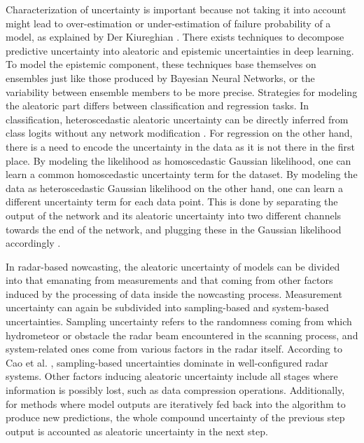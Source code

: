 Characterization of uncertainty is important because not taking it into account might lead to over-estimation or under-estimation of failure probability of a model, as explained by Der Kiureghian \cite{kiureghian_aleatory_2009}. 
There exists techniques to decompose predictive uncertainty into aleatoric and epistemic uncertainties in deep learning. To model the epistemic component, these techniques base themselves on ensembles just like those produced by Bayesian Neural Networks, or the variability between ensemble members to be more precise. Strategies for modeling the aleatoric part differs between classification and regression tasks. In classification, heteroscedastic aleatoric uncertainty can be directly inferred from class logits without any network modification \cite{shridhar_comprehensive_2019, kwon_uncertainty_2020}. For regression on the other hand, there is a need to encode the uncertainty in the data as it is not there in the first place. By modeling the likelihood as homoscedastic Gaussian likelihood, one can learn a common homoscedastic uncertainty term for the dataset. By modeling the data as heteroscedastic Gaussian likelihood on the other hand, one can learn a different uncertainty term for each data point. This is done by separating the output of the network and its aleatoric uncertainty into two different channels towards the end of the network, and plugging these in the Gaussian likelihood accordingly \cite{kendall_what_2017}.

In radar-based nowcasting, the aleatoric uncertainty of models can be divided into that emanating from measurements and that coming from other factors induced by the processing of data inside the nowcasting process. Measurement uncertainty can again be subdivided into sampling-based and system-based uncertainties. Sampling uncertainty refers to the randomness coming from which hydrometeor or obstacle the radar beam encountered in the scanning process, and system-related ones come from various factors in the radar itself. According to Cao et al. \cite{cao_measurement_2016}, sampling-based uncertainties dominate in well-configured radar systems. Other factors inducing aleatoric uncertainty include all stages where information is possibly lost, such as data compression operations. Additionally, for methods where model outputs are iteratively fed back into the algorithm to produce new predictions, the whole compound uncertainty of the previous step output is accounted as aleatoric uncertainty in the next step. 


